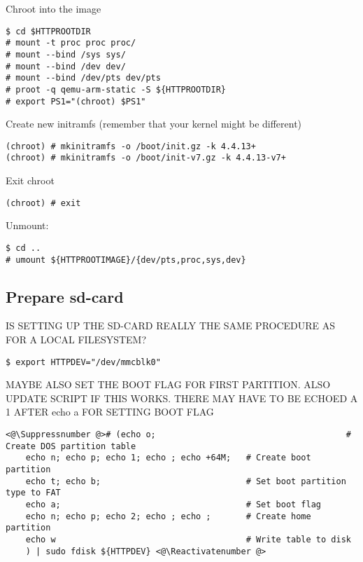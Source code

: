 Chroot into the image
\begin{lstlisting}[]
$ cd $HTTPROOTDIR
# mount -t proc proc proc/
# mount --bind /sys sys/
# mount --bind /dev dev/
# mount --bind /dev/pts dev/pts
# proot -q qemu-arm-static -S ${HTTPROOTDIR}
# export PS1="(chroot) $PS1"
\end{lstlisting}
\FloatBarrier
\vspace{-5mm}


Create new initramfs (remember that your kernel might be different)
\begin{lstlisting}[]
(chroot) # mkinitramfs -o /boot/init.gz -k 4.4.13+
(chroot) # mkinitramfs -o /boot/init-v7.gz -k 4.4.13-v7+
\end{lstlisting}
\FloatBarrier
\vspace{-5mm}

Exit chroot
\begin{lstlisting}[]
(chroot) # exit
\end{lstlisting}
\FloatBarrier
\vspace{-5mm}

Unmount:
\begin{lstlisting}[]
$ cd ..
# umount ${HTTPROOTIMAGE}/{dev/pts,proc,sys,dev}
\end{lstlisting}
\FloatBarrier
\vspace{-5mm}


\subsection{Prepare sd-card}

IS SETTING UP THE SD-CARD REALLY THE SAME PROCEDURE AS FOR A LOCAL FILESYSTEM?

\begin{lstlisting}[]
$ export HTTPDEV="/dev/mmcblk0"
\end{lstlisting}
\FloatBarrier
\vspace{-5mm}

MAYBE ALSO SET THE BOOT FLAG FOR FIRST PARTITION. ALSO UPDATE SCRIPT IF THIS
WORKS. THERE MAY HAVE TO BE ECHOED A 1 AFTER echo a FOR SETTING BOOT FLAG
\begin{lstlisting}[]
<@\Suppressnumber @># (echo o;                                      # Create DOS partition table
    echo n; echo p; echo 1; echo ; echo +64M;   # Create boot partition
    echo t; echo b;                             # Set boot partition type to FAT
    echo a;                                     # Set boot flag
    echo n; echo p; echo 2; echo ; echo ;       # Create home partition
    echo w                                      # Write table to disk
    ) | sudo fdisk ${HTTPDEV} <@\Reactivatenumber @>
\end{lstlisting}
\FloatBarrier
\vspace{-5mm}

